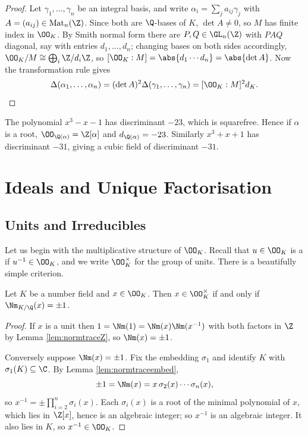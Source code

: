 \begin{proof}
	Let $\gamma_1, \dots, \gamma_n$ be an integral basis, and write $\alpha_i = \sum_j a_{ij}\gamma_j$ with $A = (a_{ij}) \in \mathrm{Mat}_n(\Z)$. Since both are $\Q$-bases of $K$, $\det A \neq 0$, so $M$ has finite index in $\OO_K$. By Smith normal form there are $P, Q \in \GL_n(\Z)$ with $PAQ$ diagonal, say with entries $d_1, \dots, d_n$; changing bases on both sides accordingly, $\OO_K/M \cong \bigoplus_i \Z/d_i\Z$, so $[\OO_K:M] = \abs{d_1\cdots d_n} = \abs{\det A}$. Now the transformation rule gives
	$$\Delta(\alpha_1,\dots,\alpha_n) = (\det A)^2\Delta(\gamma_1,\dots,\gamma_n) = [\OO_K:M]^2 d_K. \qedhere$$
\end{proof}

\begin{example}
	The polynomial $x^3 - x - 1$ has discriminant $-23$, which is squarefree. Hence if $\alpha$ is a root, $\OO_{\Q(\alpha)} = \Z[\alpha]$ and $d_{\Q(\alpha)} = -23$. Similarly $x^3 + x + 1$ has discriminant $-31$, giving a cubic field of discriminant $-31$.
\end{example}

\section{Ideals and Unique Factorisation}\label{sec:ideals}

\subsection{Units and Irreducibles}

Let us begin with the multiplicative structure of $\OO_K$. Recall that $u \in \OO_K$ is a  if $u^{-1} \in \OO_K$, and we write $\OO_K^\times$ for the group of units. There is a beautifully simple criterion.

\begin{lemma}\label{lem:unitnorm}
	Let $K$ be a number field and $x \in \OO_K$. Then $x \in \OO_K^\times$ if and only if $\Nm_{K/\Q}(x) = \pm 1$.
\end{lemma}

\begin{proof}
	If $x$ is a unit then $1 = \Nm(1) = \Nm(x)\Nm(x^{-1})$ with both factors in $\Z$ by Lemma \ref{lem:normtraceZ}, so $\Nm(x) = \pm 1$.

	Conversely suppose $\Nm(x) = \pm1$. Fix the embedding $\sigma_1$ and identify $K$ with $\sigma_1(K) \subseteq \C$. By Lemma \ref{lem:normtraceembed},
	$$\pm 1 = \Nm(x) = x\,\sigma_2(x)\cdots\sigma_n(x),$$
	so $x^{-1} = \pm\prod_{i=2}^n\sigma_i(x)$. Each $\sigma_i(x)$ is a root of the minimal polynomial of $x$, which lies in $\Z[x]$, hence is an algebraic integer; so $x^{-1}$ is an algebraic integer. It also lies in $K$, so $x^{-1} \in \OO_K$.
\end{proof}

